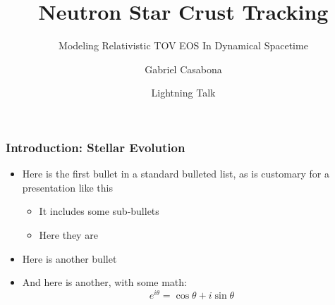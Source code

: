 \documentclass[aspectratio=1610]{beamer}
\title{Neutron Star Crust Tracking}
\subtitle{Modeling Relativistic TOV EOS In Dynamical Spacetime}
\author{Gabriel Casabona}
\date[8/9/2022]{Lightning Talk}
\begin{document}
\maketitle

\begin{frame}
\frametitle{Introduction: Stellar Evolution}
    \begin{itemize}
        \item Here is the first bullet in a standard bulleted list,
            as is customary for a presentation like this
        \begin{itemize}
            \item It includes some sub-bullets
            \item Here they are
        \end{itemize}
        \item Here is another bullet
        \item And here is another, with some math:
            \[ e^{i\theta} = \cos \theta + i \sin \theta \]
    \end{itemize}
\end{frame}
 
\end{document}
